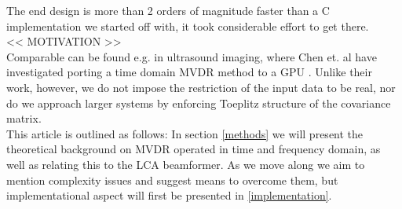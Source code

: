 \documentclass[
a4paper,10pt
]{ica2013_2}
\newcommand\1{\vec 1}
\begin{document}
The end design is more than 2 orders of magnitude faster than a C implementation we started off with, it took considerable effort to get there.
\\
<< MOTIVATION >>
\\
Comparable can be found e.g. in ultrasound imaging, where Chen et. al have investigated porting a time domain MVDR method to a GPU \cite{Chen2009,Chen2011,Chen2011a,}. Unlike their work, however, we do not impose the restriction of the input data to be real, nor do we approach larger systems by enforcing Toeplitz structure of the covariance matrix. 
\\
This article is outlined as follows: In section \ref{methods} we will present the theoretical background on MVDR operated in time and frequency domain, as well as relating this to the LCA beamformer.  As we move along we aim to mention complexity issues and suggest means to overcome them, but implementational aspect will first be presented in \ref{implementation}.

% 


% 
% 
% 
% 
% 
% 
% 
\end{document}
